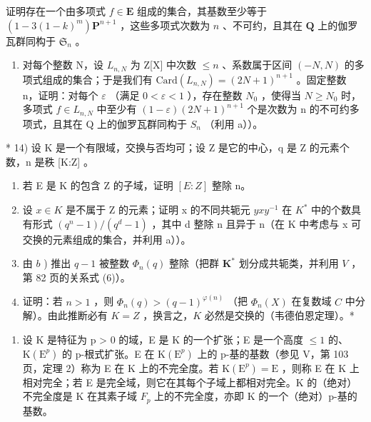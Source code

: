 证明存在一个由多项式 \(f \in \mathbf{E}\) 组成的集合，其基数至少等于 \((1 - 3(1 - k)^m) \mathbf{P}^{n+1}\) ，这些多项式次数为 \(n\) 、不可约，且其在 \(\mathbf{Q}\) 上的伽罗瓦群同构于 \(\mathfrak{S}_n\) 。

\begin{enumerate}
\def\labelenumi{\alph{enumi})}
\setcounter{enumi}{1}
\tightlist
\item
  对每个整数 N，设 \(L_{n,N}\) 为 Z{[}X{]} 中次数 \(\leqslant n\) 、系数属于区间 \((-N, N)\) 的多项式组成的集合；于是我们有 \(\text{Card}(L_{n,N}) = (2N + 1)^{n+1}\) 。固定整数 n，证明：对每个 \(\varepsilon\) （满足 \(0 < \varepsilon < 1\) ），存在整数 \(N_0\) ，使得当 \(N \geqslant N_0\) 时，多项式 \(f \in L_{n,N}\) 中至少有 \((1 - \varepsilon)(2N + 1)^{n+1}\) 个是次数为 n 的不可约多项式，且其在 Q 上的伽罗瓦群同构于 \(S_n\) （利用 a））。
\end{enumerate}

* 14) 设 K 是一个有限域，交换与否均可；设 Z 是它的中心，q 是 Z 的元素个数，n 是秩 {[}K:Z{]} 。

\begin{enumerate}
\def\labelenumi{\alph{enumi})}
\item
  若 E 是 K 的包含 Z 的子域，证明 \([E:Z]\) 整除 n。
\item
  设 \(x \in K\) 是不属于 Z 的元素；证明 x 的不同共轭元 \(yxy^{-1}\) 在 \(K^{*}\) 中的个数具有形式 \((q^{n}-1)/(q^{d}-1)\) ，其中 d 整除 n 且异于 n（在 K 中考虑与 x 可交换的元素组成的集合，并利用 a））。
\item
  由 \(b\) ) 推出 \(q - 1\) 被整数 \(\Phi_n(q)\) 整除（把群 \(\mathbf{K}^*\) 划分成共轭类，并利用 \(V\) ，第 82 页的关系式 (6)）。
\item
  证明：若 \(n > 1\) ，则 \(\Phi_n(q) > (q - 1)^{\varphi(n)}\) （把 \(\Phi_n(X)\) 在复数域 \(C\) 中分解）。由此推断必有 \(K = Z\) ，换言之，\(K\) 必然是交换的（韦德伯恩定理）。*
\end{enumerate}

\BourbakiExerciseGroup

\begin{enumerate}
\def\labelenumi{\arabic{enumi})}
\tightlist
\item
  设 K 是特征为 p \textgreater{} 0 的域，E 是 K 的一个扩张；E 是一个高度 \(\leqslant 1\) 的、\(\mathrm{K}(\mathrm{E}^{p})\) 的 p-根式扩张。E 在 \(\mathrm{K}(\mathrm{E}^{p})\) 上的 p-基的基数（参见 V，第 103 页，定理 2）称为 E 在 K 上的不完全度。若 \(\mathrm{K}(\mathrm{E}^{p}) = \mathrm{E}\) ，则称 E 在 K 上相对完全；若 E 是完全域，则它在其每个子域上都相对完全。K 的（绝对）不完全度是 K 在其素子域 \(F_{p}\) 上的不完全度，亦即 K 的一个（绝对）p-基的基数。
\end{enumerate}

